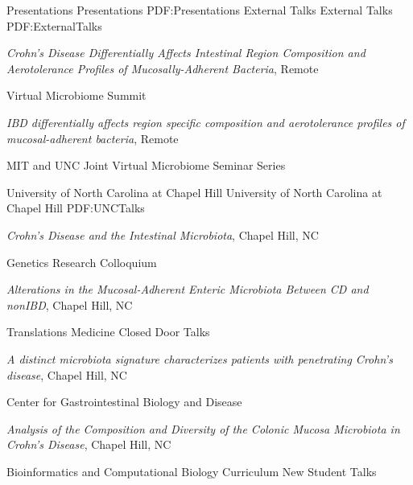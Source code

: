 \documentclass[letterpaper,MMMyyyy,nonstopmode]{simpleresumecv}
\begin{document}
\begin{Body}
\Section
{Presentations}
{Presentations}
{PDF:Presentations}
\BigGap
\SubSection
{External Talks}
{External Talks}
{PDF:ExternalTalks}

\BulletItem
\textit{Crohn’s Disease Differentially Affects Intestinal Region Composition and Aerotolerance
Profiles of Mucosally-Adherent Bacteria},
Remote
\hfill
{} 
\begin{Detail}
\Item
Virtual Microbiome Summit
\end{Detail}

\BulletItem
\textit{IBD differentially affects region specific composition and aerotolerance profiles of
mucosal-adherent bacteria},
Remote
\hfill
{} 
\begin{Detail}
\Item
MIT and UNC Joint Virtual Microbiome Seminar Series
\end{Detail}

\BigGap
\SubSection
{University of North Carolina at Chapel Hill}
{University of North Carolina at Chapel Hill}
{PDF:UNCTalks}

\BulletItem
\textit{Crohn’s Disease and the Intestinal Microbiota},\newline
Chapel Hill, NC
\hfill
{} 
\begin{Detail}
\Item
Genetics Research Colloquium
\end{Detail}

\BulletItem
\textit{Alterations in the Mucosal-Adherent Enteric Microbiota Between CD and nonIBD},\newline
Chapel Hill, NC
\hfill
{} 
\begin{Detail}
\Item
Translations Medicine Closed Door Talks
\end{Detail}

\BulletItem
\textit{A distinct microbiota signature characterizes patients with penetrating Crohn’s disease},\newline
Chapel Hill, NC
\hfill
{} 
\begin{Detail}
\Item
Center for Gastrointestinal Biology and Disease
\end{Detail}

\BulletItem
\textit{Analysis of the Composition and Diversity of the Colonic Mucosa Microbiota in Crohn’s
Disease},\newline
Chapel Hill, NC
\hfill
{} 
\begin{Detail}
\Item
Bioinformatics and Computational Biology Curriculum New Student Talks
\end{Detail}


\end{Body}
\end{document}
